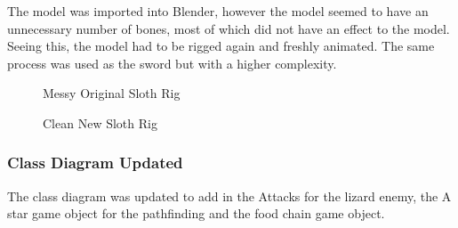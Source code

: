 \documentclass[12pt]{report}
\begin{document}
The model was imported into Blender, however the model seemed to have an unnecessary number of bones, most of which did not have an effect to the model. Seeing this, the model had to be rigged again and freshly animated. The same process was used as the sword but with a higher complexity.



\begin{figure}[H]
    \begin{minipage}{.5\textwidth}
        \centering
        \caption{Messy Original Sloth Rig}
    \end{minipage}
    \begin{minipage}{.5\textwidth}
        \centering
        \caption{Clean New Sloth Rig}
    \end{minipage}
\end{figure}


\subsubsection{Class Diagram Updated}

The class diagram was updated to add in the Attacks for the lizard enemy, the A star game object for the pathfinding and the food chain game object.
\end{document}
